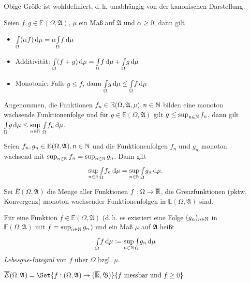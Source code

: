 \documentclass{cheat-sheet}
\newcommand{\ER}{\overline\R} %
\newcommand{\Alg}{\mathfrak{A}}
\newcommand{\Bor}{\mathfrak{B}} %
\newcommand{\E}{\mathbb{E}} %
\newcommand{\IntOmu}[1]{\Int{\Omega}{}{#1}{\mu}}
\begin{document}
\begin{bem}
  Obige Größe ist wohldefiniert, d.\,h. unabhängig von der kanonischen Darstellung.
\end{bem}

\begin{satz}
  Seien $f, g \in \E(\Omega, \Alg)$, $\mu$ ein Maß auf $\Alg$ und $\alpha \geq 0$, dann gilt
  \begin{itemize}
    \item $\IntOmu{(\alpha f)} = \alpha \IntOmu{f}$
    \item Additivität: $\IntOmu{(f + g)} = \IntOmu{f} + \IntOmu{g}$
    \item Monotonie: Falls $g \leq f$, dann $\IntOmu{g} \leq \IntOmu{f}$
  \end{itemize}
\end{satz}

\begin{satz}
  Angenommen, die Funktionen $f_n \in \E(\Omega, \Alg, \mu), n \in \N$ bilden eine monoton wachsende Funktionenfolge und für $g \in \E(\Omega, \Alg)$ gilt $g \leq \sup_{n \in \mathbb{N}} f_n$, dann gilt $\textstyle \IntOmu{g} \leq \sup\limits_{n \in \N} \, \IntOmu{f_n}$.
\end{satz}

\begin{kor}
  Seien $f_n, g_n \in \E(\Omega, \Alg), n \in \N$ und die Funktionenfolgen $f_n$ und $g_n$ monoton wachsend mit $\sup_{n \in \mathbb{N}} f_n = \sup_{n \in \mathbb{N}} g_n$. Dann gilt
  \[ \sup_{n \in \N} \IntOmu{f_n} = \sup_{n \in \N} \IntOmu{g_n}. \]
\end{kor}

\begin{defn}
  Sei $\overline{E}(\Omega, \Alg)$ die Menge aller Funktionen $f : \Omega \to \ER$, die Grenzfunktionen (pktw. Konvergenz) monoton wachsender Funktionenfolgen in $\E(\Omega, \Alg)$ sind.
\end{defn}

\begin{defn}
  Für eine Funktion $f \in \overline{\E}(\Omega, \Alg)$ (d.\,h. es existiert eine Folge $(g_n)_{n \in \mathbb{N}}$ in $\E(\Omega, \Alg)$ mit $f = \sup_{n \in \mathbb{N}} g_n$) und ein Maß $\mu$ auf $\Alg$ heißt
  \[ \IntOmu{f} \coloneqq \sup_{n \in \N} \IntOmu{g_n} \]
  \emph{Lebesgue-Integral} von $f$ über $\Omega$ bzgl. $\mu$.
\end{defn}

\begin{satz}
  $\overline{E}(\Omega, \Alg) = \Set{ f : (\Omega, \Alg) \to (\ER, \Bor) }{ f \text{ messbar und } f \geq 0 }$
\end{satz}
\end{document}
